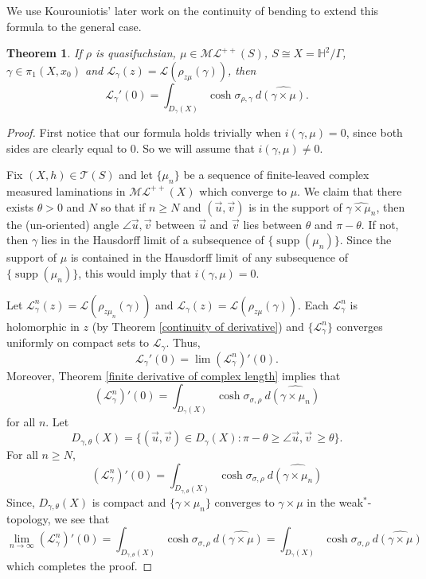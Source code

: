 \documentclass{amsart}
\theoremstyle{plain}
\newtheorem{theorem}[proposition]{Theorem}
\theoremstyle{definition}
\theoremstyle{remark}
\newcommand{\supp}{{\operatorname{supp}}}
\newcommand{\<}{\left <}
\renewcommand{\>}{\right >}
\begin{document}
We use Kourouniotis' later work  \cite{kouron-cont} on the continuity of bending to extend this formula  to the general case.

\begin{theorem}
\label{derivative of complex length}
If $\rho$ is quasifuchsian, $\mu\in \mathcal{ML}^{++}(S)$, $S\cong X = \mathbb H^2/\Gamma$,  $\gamma\in \pi_1(X,x_0)$ and
$\mathcal L_\gamma(z)=\mathcal L(\rho_{z\mu}(\gamma))$, then
$$\mathcal L_\gamma'(0) = \int_{D_\gamma(X)}  \cosh \sigma_{\rho,\gamma}\ d\widehat{(\gamma\times\mu)}. $$ 
\end{theorem}

\begin{proof}
First notice that our formula holds trivially when $i(\gamma,\mu)=0$, since both sides are clearly equal to 0.
So we will assume that $i(\gamma,\mu)\ne 0$.

Fix $(X,h)\in\mathcal T(S)$ and
let $\{\mu_n\}$ be a sequence of finite-leaved complex measured laminations in $\mathcal{ML}^{++}(X)$ which converge to $\mu$.
We claim that there exists $\theta>0$  and $N$ so that if $n\ge N$ and $(\vec u,\vec v)$ is in the support of
$\widehat{\gamma\times\mu_n}$, then the (un-oriented) angle $\angle \vec u,\vec v$ between $\vec u$ and $\vec v$ lies between
$\theta$ and $\pi-\theta$.
If not, then $\gamma$ lies in the Hausdorff limit of a subsequence of $\{\supp(\mu_n)\}$. Since the support of $\mu$ is contained
in the Hausdorff limit of any subsequence of $\{\supp(\mu_n)\}$, this would imply that $i(\gamma,\mu)=0$.

Let $\mathcal L_\gamma^n(z)=\mathcal L(\rho_{z\mu_n}(\gamma))$ and $\mathcal L_\gamma(z)= \mathcal L(\rho_{z\mu}(\gamma))$. Each 
$\mathcal L_\gamma^n$ is  holomorphic in $z$ (by Theorem \ref{continuity of derivative}) and  
$\{\mathcal L_\gamma^n\}$ converges uniformly on compact sets to $\mathcal L_\gamma$. Thus,
$$\mathcal L_\gamma'(0)=\lim (\mathcal L_\gamma^n)'(0).$$
Moreover, Theorem \ref{finite derivative of complex length} implies that
$$(\mathcal L_\gamma^n)'(0)= \int_{D_\gamma(X)} \cosh\sigma_{\sigma,\rho}\ d\widehat{(\gamma\times\mu_n)}$$
for all $n$.
Let
$$D_{\gamma,\theta}(X)=\{(\vec u,\vec v)\in D_\gamma(X) : \pi-\theta\ge\angle \vec u,\vec v\,\ge\theta\}.$$
For all $n\ge N$,
$$(\mathcal L_\gamma^n)'(0)= \int_{D_{\gamma,\theta}(X)} \cosh\sigma_{\sigma,\rho}\ d\widehat{(\gamma\times\mu_n)}$$
Since, $D_{\gamma,\theta}(X)$ is compact and $\{\gamma\times\mu_n\}$ converges
to $\gamma\times\mu$ in the weak$^*$-topology, we see that
$$\lim_{n\rightarrow \infty} (\mathcal L_\gamma^n)'(0)= \int_{D_{\gamma,\theta}(X)} \cosh\sigma_{\sigma,\rho}\ d\widehat{(\gamma\times\mu)}=
 \int_{D_{\gamma}(X)} \cosh\sigma_{\sigma,\rho}\ d\widehat{(\gamma\times\mu)}$$
which completes the proof.
\end{proof}
\end{document}
